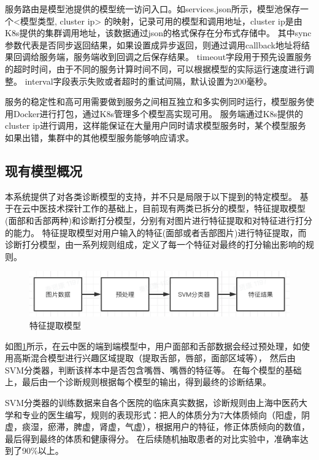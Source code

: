 服务路由是模型池提供的模型统一访问入口。如services.json所示，模型池保存一个<模型类型, cluster ip> 的映射，记录可用的模型和调用地址，cluster ip是由K8s提供的集群调用地址，该数据通过json的格式保存在分布式存储中。
其中sync参数代表是否同步返回结果，如果设置成异步返回，则通过调用callback地址将结果回调给服务端，服务端收到回调之后保存结果。
timeout字段用于预先设置服务的超时时间，由于不同的服务计算时间不同，可以根据模型的实际运行速度进行调整。
interval字段表示失败或者超时的重试间隔，默认设置为200毫秒。

服务的稳定性和高可用需要做到服务之间相互独立和多实例同时运行，模型服务使用Docker进行打包，通过K8s管理多个模型高实现可用。
服务端通过K8s提供的cluster ip进行调用，这样能保证在大量用户同时请求模型服务时，某个模型服务如果出错，集群中的其他模型服务能够响应请求。

\subsection{现有模型概况}

本系统提供了对各类诊断模型的支持，并不只是局限于以下提到的特定模型。
基于在云中医技术探针工作的基础上，目前现有两类已拆分的模型，特征提取模型(面部和舌部两种)和诊断打分模型，分别有对图片进行特征提取和对特征进行打分的能力。
特征提取模型对用户输入的特征(面部或者舌部图片)进行特征提取，而诊断打分模型，由一系列规则组成，定义了每一个特征对最终的打分输出影响的规则。

\begin{figure}[ht]
    \centering
    \includegraphics[width=15cm]{images/model.png}
    \caption{特征提取模型}
    \label{fig:my_model}
\end{figure}

如图\ref{fig:my_model}所示，在云中医的端到端模型中，用户面部和舌部数据会经过预处理，如使用高斯混合模型进行兴趣区域提取（提取舌部，唇部，面部区域等），
然后由SVM分类器，判断该样本中是否包含嘴唇、嘴唇的特征等。
在每个模型的基础上，最后由一个诊断规则根据每个模型的输出，得到最终的诊断结果。

SVM分类器的训练数据来自各个医院的临床真实数据，诊断规则由上海中医药大学和专业的医生编写，规则的表现形式：把人的体质分为7大体质倾向（阳虚，阴虚，痰湿，瘀滞，脾虚，肾虚，气虚），根据用户的特征，修正体质倾向的数值，最后得到最终的体质和健康得分。
在后续随机抽取患者的对比实验中，准确率达到了90\%以上。

